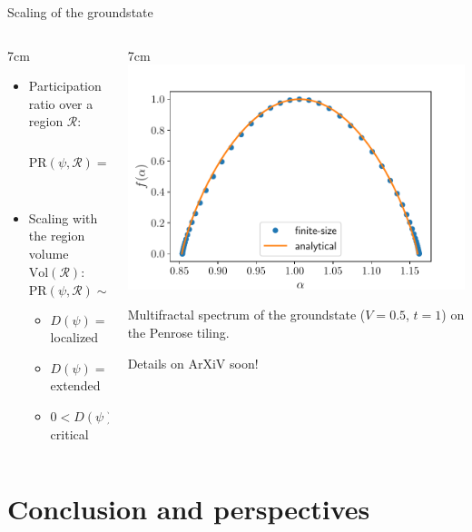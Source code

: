 \documentclass[xcolor=x11names,compress,professionalfonts, aspectratio=169]{beamer}
\renewcommand{\(}{\begin{columns}}
\renewcommand{\)}{\end{columns}}
\newcommand{\<}[1]{\begin{column}{#1}}
\renewcommand{\>}{\end{column}}
\begin{document}
\begin{frame}{Scaling of the groundstate}

\begin{columns}
\<{7cm}
\begin{itemize}
	\item Participation ratio over a region $\mathcal{R}$:
	\[
		\text{PR}(\psi, \mathcal{R}) = \frac{\left( \sum_{m \in \mathcal{R}}|\psi_m|^2 \right)^2}{\left( \sum_{m\in \mathcal{R}} |\psi_m|^4 \right)^4}
	\]
	\item Scaling with the region volume $\text{Vol}(\mathcal{R})$:
	\[
		\text{PR}(\psi, \mathcal{R}) \sim \text{Vol}(\mathcal{R})^{D(\psi)}
	\]
	\begin{itemize}
		\item $D(\psi) = 0 \implies \psi$ localized
		\item $D(\psi) = 1 \implies \psi$ extended
		\item $0 < D(\psi) < 1 \implies \psi$ critical
 	\end{itemize}
\end{itemize}
\>

\<{7cm}
\centering
\includegraphics[scale=.5]{img/multifractal_spectrum_Penrose_V_m0p5.pdf}
%


Multifractal spectrum of the groundstate ($V=0.5$, $t=1$) on the Penrose tiling.

{

\flushright
Details on ArXiV soon!

}
\>
\end{columns}
\end{frame}

\section{Conclusion and perspectives}
\end{document}
